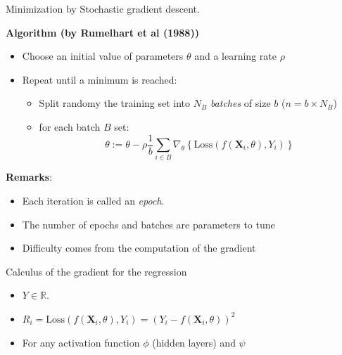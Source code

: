 \documentclass[compress,10pt]{beamer}
\begin{document}
\begin{frame}{Minimization by Stochastic gradient descent.}

\textbf{Algorithm (by Rumelhart et al (1988))}

\begin{itemize}
\item
  Choose an initial value of parameters \(\theta\) and a learning rate
  \(\rho\)
\item
  Repeat until a minimum is reached:

  \begin{itemize}
  
  \item
    Split randomy the training set into \(N_B\) \emph{batches} of size
    \(b\) (\(n = b \times N_B\))
  \item
    for each batch \(B\) set:
    \[ \theta:= \theta - \rho \frac{1}{b}\sum_{i \in B} \nabla_{\theta} \left\{  \text{Loss}(f(\mathbf{X}_i,\theta),Y_i) \right\}\]
  \end{itemize}
\end{itemize}

\textbf{Remarks}:

\begin{itemize}
\item
  Each iteration is called an \emph{epoch}.
\item
  The number of epochs  and batches are  parameters  to tune
\item
  Difficulty comes from the computation of the gradient
\end{itemize}

\end{frame}
\begin{frame}{Calculus of the gradient for the regression}
\protect\hypertarget{calculus-of-the-gradient-for-the-regression}{}

\begin{itemize}

\item
  \(Y \in \mathbb{R}\).
\item
  \(R_i = \text{Loss}(f(\mathbf{X}_i,\theta),Y_i) = (Y_{i} - f(\mathbf{X}_i,\theta))^2\)
\item
  For any activation function \(\phi\) (hidden layers) and \(\psi\)
\end{itemize}

\end{frame}
\end{document}
